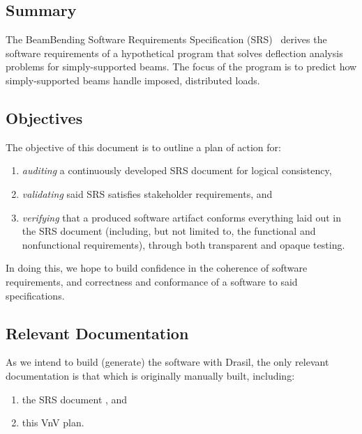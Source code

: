 \documentclass[12pt, titlepage]{article}
\begin{document}
\subsection{Summary}

The BeamBending Software Requirements Specification
(SRS)~\cite{BalaciBeamBendingSRS2023} derives the software requirements of a
hypothetical program that solves deflection analysis problems for
simply-supported beams. The focus of the program is to predict how
simply-supported beams handle imposed, distributed loads.

\subsection{Objectives}

The objective of this document is to outline a plan of action for:

\begin{enumerate}

    \item \textit{auditing} a continuously developed SRS document
          \cite{ParnasAndClements1986} for logical consistency,

    \item \textit{validating} said SRS satisfies stakeholder requirements, and

    \item \textit{verifying} that a produced software artifact conforms
          everything laid out in the SRS document (including, but not limited
          to, the functional and nonfunctional requirements), through both
          transparent and opaque testing.

\end{enumerate}

In doing this, we hope to build confidence in the coherence of software
requirements, and correctness and conformance of a software to said
specifications.

\subsection{Relevant Documentation}

As we intend to build (generate) the software with Drasil, the only relevant
documentation is that which is originally manually built, including:

\begin{enumerate}

    \item the SRS document \cite{BalaciBeamBendingSRS2023}, and

    \item this VnV plan.

\end{enumerate}
\end{document}
